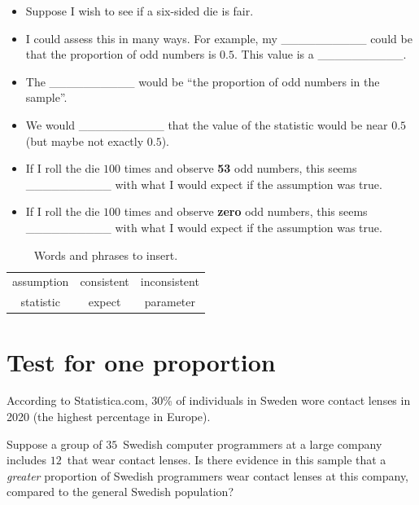 \documentclass[
  11pt,
  a4paper,
  krantz2]{krantz}
\makeatletter
\providecommand{\tightlist}{%
  \setlength{\itemsep}{0pt}\setlength{\parskip}{0pt}}
\renewenvironment{quote}%
{\begin{kframe}}
{\end{kframe}}
\newenvironment{kframe}{%
\medskip{}
\setlength{\fboxsep}{.8em}
 \def\at@end@of@kframe{}%
 \ifinner\ifhmode%
  \def\at@end@of@kframe{\end{minipage}}%
  \begin{minipage}{\columnwidth}%
 \fi\fi%
 \def\FrameCommand##1{\hskip\@totalleftmargin \hskip-\fboxsep
 \colorbox{shadecolor}{##1}\hskip-\fboxsep
     \hskip-\linewidth \hskip-\@totalleftmargin \hskip\columnwidth}%
 \MakeFramed {\advance\hsize-\width
   \@totalleftmargin\z@ \linewidth\hsize
   \@setminipage}}%
 {\par\unskip\endMakeFramed%
 \at@end@of@kframe}
\renewenvironment{quote}
               {\list{}{\vspace{-0.5em}\begin{kframe}\small%
                        \rightmargin   \leftmargin
                        \parsep        \z@ \@plus\p@}%
                \item\relax}
               {\end{kframe}\endlist}
\makeatother
\begin{document}
\begin{quote}
\begin{itemize}
\tightlist
\item
  Suppose I wish to see if a six-sided die is fair.\\
\item
  I could assess this in many ways.
  For example, my \_\_\_\_\_\_\_\_\_\_ could be that the proportion of odd numbers is \(0.5\).
  This value is a \_\_\_\_\_\_\_\_\_\_.\\
\item
  The \_\_\_\_\_\_\_\_\_\_ would be ``the proportion of odd numbers in the sample''.\\
\item
  We would \_\_\_\_\_\_\_\_\_\_ that the value of the statistic would be near \(0.5\) (but maybe not exactly \(0.5\)).\\
\item
  If I roll the die \(100\) times and observe \textbf{53} odd numbers, this seems \_\_\_\_\_\_\_\_\_\_ with what I would expect if the assumption was true.\\
\item
  If I roll the die \(100\) times and observe \textbf{zero} odd numbers, this seems \_\_\_\_\_\_\_\_\_\_ with what I would expect if the assumption was true.
\end{itemize}
\end{quote}

\begin{table}
\centering
\caption{\label{tab:Words3Table}Words and phrases to insert.}
\centering
\fontsize{10}{12}\selectfont
\begin{tabular}[t]{ccc}
\toprule
assumption & consistent & inconsistent\\
statistic & expect & parameter\\
\bottomrule
\end{tabular}
\end{table}

\section{Test for one proportion}\label{HTOneProportionA}

According to
Statistica.com,
\(30\)\% of individuals in Sweden wore contact lenses in 2020 (the highest percentage in Europe).

Suppose a group of \(35\)~Swedish computer programmers at a large company includes \(12\)~that wear contact lenses.
Is there evidence in this sample that a \emph{greater} proportion of Swedish programmers wear contact lenses at this company, compared to the general Swedish population?
\end{document}
